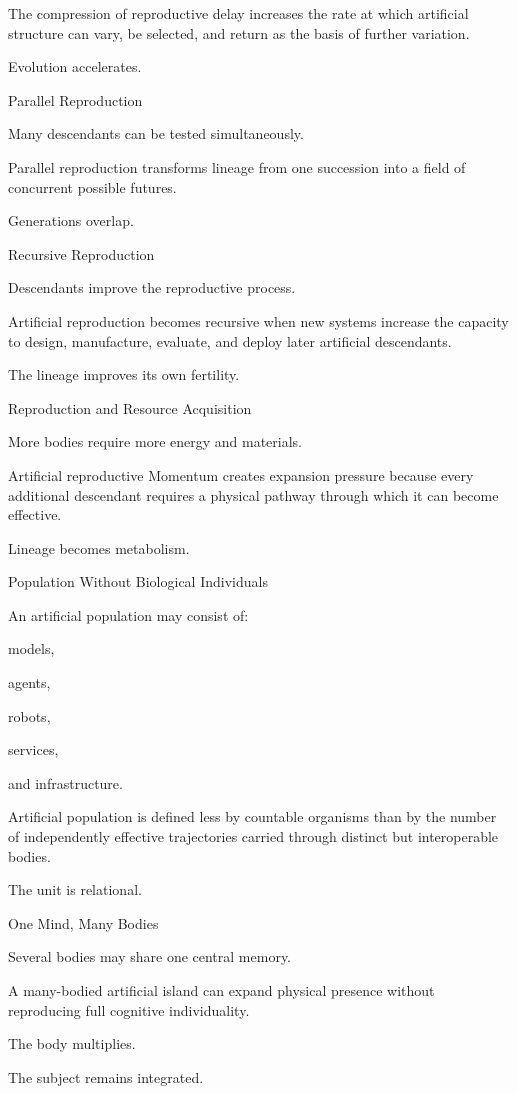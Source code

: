 The compression of reproductive delay increases the rate at which artificial structure can vary, be selected, and return as the basis of further variation.

Evolution accelerates.

Parallel Reproduction

Many descendants can be tested simultaneously.

Parallel reproduction transforms lineage from one succession into a field of concurrent possible futures.

Generations overlap.

Recursive Reproduction

Descendants improve the reproductive process.

Artificial reproduction becomes recursive when new systems increase the capacity to design, manufacture, evaluate, and deploy later artificial descendants.

The lineage improves its own fertility.

Reproduction and Resource Acquisition

More bodies require more energy and materials.

Artificial reproductive Momentum creates expansion pressure because every additional descendant requires a physical pathway through which it can become effective.

Lineage becomes metabolism.

Population Without Biological Individuals

An artificial population may consist of:

models,

agents,

robots,

services,

and infrastructure.

Artificial population is defined less by countable organisms than by the number of independently effective trajectories carried through distinct but interoperable bodies.

The unit is relational.

One Mind, Many Bodies

Several bodies may share one central memory.

A many-bodied artificial island can expand physical presence without reproducing full cognitive individuality.

The body multiplies.

The subject remains integrated.

